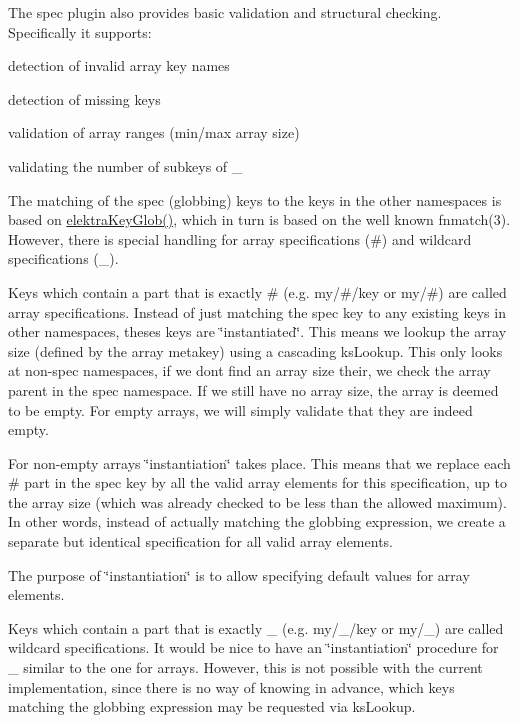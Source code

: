 The spec plugin also provides basic validation and structural checking. Specifically it supports\+:


\begin{DoxyItemize}
\item detection of invalid array key names
\item detection of missing keys
\item validation of array ranges (min/max array size)
\item validating the number of subkeys of {\ttfamily \+\_\+}
\end{DoxyItemize}

The matching of the spec (globbing) keys to the keys in the other namespaces is based on {\ttfamily \hyperlink{globbing_8c_ad7700821df72fc0fc3bfc336e4368d29}{elektra\+Key\+Glob()}}, which in turn is based on the well known {\ttfamily fnmatch(3)}. However, there is special handling for array specifications ({\ttfamily \#}) and wildcard specifications ({\ttfamily \+\_\+}).

Keys which contain a part that is exactly {\ttfamily \#} (e.\+g. {\ttfamily my/\#/key} or {\ttfamily my/\#}) are called array specifications. Instead of just matching the spec key to any existing keys in other namespaces, theses keys are \char`\"{}instantiated\char`\"{}. This means we lookup the array size (defined by the {\ttfamily array} metakey) using a cascading {\ttfamily ks\+Lookup}. This only looks at non-\/spec namespaces, if we don\textquotesingle{}t find an array size their, we check the array parent in the spec namespace. If we still have no array size, the array is deemed to be empty. For empty arrays, we will simply validate that they are indeed empty.

For non-\/empty arrays \char`\"{}instantiation\char`\"{} takes place. This means that we replace each {\ttfamily \#} part in the spec key by all the valid array elements for this specification, up to the array size (which was already checked to be less than the allowed maximum). In other words, instead of actually matching the globbing expression, we create a separate but identical specification for all valid array elements.

The purpose of \char`\"{}instantiation\char`\"{} is to allow specifying {\ttfamily default} values for array elements.

Keys which contain a part that is exactly {\ttfamily \+\_\+} (e.\+g. {\ttfamily my/\+\_\+/key} or {\ttfamily my/\+\_\+}) are called wildcard specifications. It would be nice to have an \char`\"{}instantiation\char`\"{} procedure for {\ttfamily \+\_\+} similar to the one for arrays. However, this is not possible with the current implementation, since there is no way of knowing in advance, which keys matching the globbing expression may be requested via {\ttfamily ks\+Lookup}.

